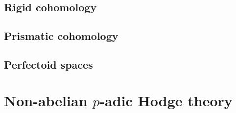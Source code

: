             
            
            
            
            
            
        \chapter{Rigid cohomology}
            \begin{abstract}
                
            \end{abstract}
            
            \minitoc
            
            
            
            
            
            
    
        \chapter{Prismatic cohomology}
            \begin{abstract}
                
            \end{abstract}
            
            \minitoc
            
            
            
            
            
            
            
        \begin{appendices}
            \chapter{Perfectoid spaces}
                \begin{abstract}
                    
                \end{abstract}
                
                \minitoc
                
                
                
                
        \end{appendices}
        
    \part{Non-abelian \texorpdfstring{$p$}{}-adic Hodge theory}
	
	\printbibliography

